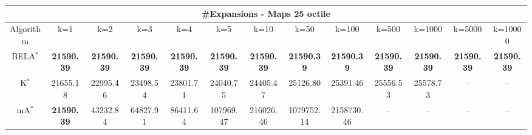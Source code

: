 \begin{tabular}{c|cccccccccccc}\toprule
\multicolumn{13}{c}{#Expansions - Maps 25 octile}\\ \midrule
Algorithm & k=1 & k=2 & k=3 & k=4 & k=5 & k=10 & k=50 & k=100 & k=500 & k=1000 & k=5000 & k=10000 \\ \midrule
BELA$^*$ & \textbf{21590.39} & \textbf{21590.39} & \textbf{21590.39} & \textbf{21590.39} & \textbf{21590.39} & \textbf{21590.39} & \textbf{21590.39} & \textbf{21590.39} & \textbf{21590.39} & \textbf{21590.39} & \textbf{21590.39} & \textbf{21590.39} \\
K$^*$ & 21655.18 & 22995.46 & 23498.54 & 23801.71 & 24040.75 & 24405.47 & 25126.80 & 25391.46 & 25556.53 & 25578.73 & -- & -- \\
mA$^*$ & \textbf{21590.39} & 43232.84 & 64827.91 & 86411.64 & 107969.47 & 216026.46 & 1079752.14 & 2158730.46 & -- & -- & -- & -- \\ \bottomrule 
\end{tabular}
